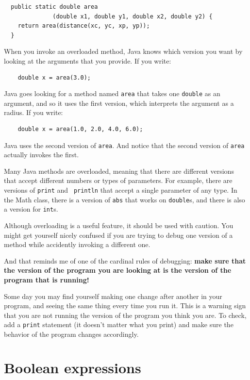 \documentclass[12pt]{book}
\theoremstyle{exercise}
\begin{document}
\begin{lstlisting}
  public static double area
              (double x1, double y1, double x2, double y2) {
    return area(distance(xc, yc, xp, yp));
  }
\end{lstlisting}
%
When you invoke an overloaded method, Java knows which version you
want by looking at the arguments that you provide.  If you write:

\begin{lstlisting}
    double x = area(3.0);
\end{lstlisting}
%
Java goes looking for a method named {\tt area} that
takes one {\tt double} as an argument, and so it uses the
first version, which interprets the argument as a radius.
If you write:

\begin{lstlisting}
    double x = area(1.0, 2.0, 4.0, 6.0);
\end{lstlisting}
%
Java uses the second version of {\tt area}.  And notice that the
second version of {\tt area} actually invokes the first.

Many Java methods are overloaded, meaning that there
are different versions that accept different numbers or types of
parameters.  For example, there are versions of {\tt print} and {\tt
println} that accept a single parameter of any type.  In the Math
class, there is a version of {\tt abs} that works on {\tt double}s,
and there is also a version for {\tt int}s.

Although overloading is a useful feature, it should be used
with caution.  You might get yourself nicely confused if you
are trying to debug one version of a method while accidently
invoking a different one.

And that reminds me of one of the cardinal rules of
debugging: {\bf make sure that the version of the program
you are looking at is the version of the program that is running!}

Some day you may find yourself making one change after another
in your program, and seeing the same thing every time you run it.
This is a warning sign that you are
not running the version of the program you think you are.  To
check, add a {\tt print} statement (it doesn't matter what
you print) and make sure the behavior of the program changes
accordingly.


\section{Boolean expressions}
\end{document}
